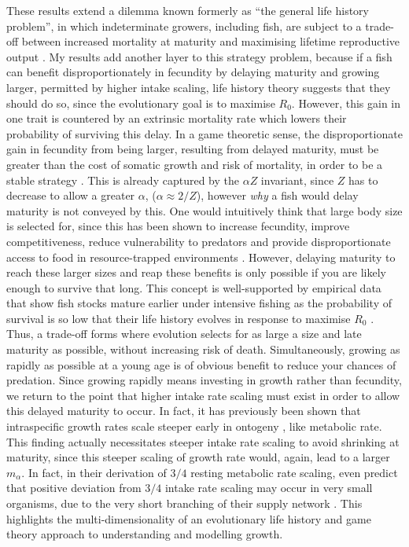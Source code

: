 \documentclass[a4paper]{article} %
\begin{document}
\begin{center}
\begin{minipage}{\linewidth}
These results extend a dilemma known formerly as ``the general life history problem'', in which indeterminate growers, including fish, are subject to a trade-off between increased mortality at maturity and maximising lifetime reproductive output \autocite{Roff1984, Roff2006, Stearns2000}. My results add another layer to this strategy problem, because if a fish can benefit disproportionately in fecundity by delaying maturity and growing larger, permitted by higher intake scaling, life history theory suggests that they should do so, since the evolutionary goal is to maximise $R_0$. However, this gain in one trait is countered by an extrinsic mortality rate which lowers their probability of surviving this delay. In a game theoretic sense, the disproportionate gain in fecundity from being larger, resulting from delayed maturity, must be greater than the cost of somatic growth and risk of mortality, in order to be a stable strategy \autocite{Arendt2011, Enberg2012}. This is already captured by the $\alpha Z$ invariant, since $Z$ has to decrease to allow a greater $\alpha$, ($\alpha \approx 2/Z$), however \textit{why} a fish would delay maturity is not conveyed by this. One would intuitively think that large body size is selected for, since this has been shown to increase fecundity, improve competitiveness, reduce vulnerability to predators and provide disproportionate access to food in resource-trapped environments \autocite{roff2002life, Oddie2000, French2005, Bashey2008, Magnhagen2001, Craig2006, Arendt2011, Pawar2012}. However, delaying maturity to reach these larger sizes and reap these benefits is only possible if you are likely enough to survive that long. This concept is well-supported by empirical data that show fish stocks mature earlier under intensive fishing as the probability of survival is so low that their life history evolves in response to maximise $R_0$ \autocite{Rowell1993, Rochet2001, Swain2011}. Thus, a trade-off forms where evolution selects for as large a size and late maturity as possible, without increasing risk of death. Simultaneously, growing as rapidly as possible at a young age is of obvious benefit to reduce your chances of predation. Since growing rapidly means investing in growth rather than fecundity, we return to the point that higher intake rate scaling must exist in order to allow this delayed maturity to occur. In fact, it has previously been shown that intraspecific growth rates scale steeper early in ontogeny \autocite{Barneche2018c}, like metabolic rate. This finding actually necessitates steeper intake rate scaling to avoid shrinking at maturity, since this steeper scaling of growth rate would, again, lead to a larger $m_{\alpha}$. In fact, in their derivation of $3/4$ resting metabolic rate scaling, \textcite{West1997} even predict that positive deviation from $3/4$ intake rate scaling may occur in very small organisms, due to the very short branching of their supply network \autocite{Barneche2018c}. This highlights the multi-dimensionality of an evolutionary life history and game theory approach to understanding and modelling growth. 


\end{minipage}
\end{center}
\end{document}
